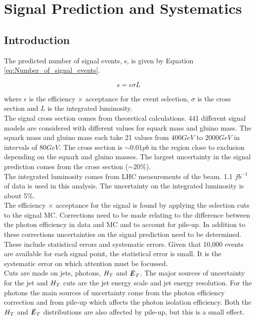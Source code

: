 \chapter{Signal Prediction and Systematics}

\section{Introduction}

The predicted number of signal events, s, is given by Equation
\ref{eq:Number_of_signal_events}.

\begin{equation}
s = \epsilon \sigma L
\label{eq:Number_of_signal_events}
\end{equation}

where $\epsilon$ is the efficiency $\times$ acceptance for the event selection,
$\sigma$ is the cross section and $L$ is the integrated luminosity. \\

The signal cross section comes from theoretical calculations. 441 different
signal models are considered with different values for squark mass and gluino 
mass. The squark mass and gluino mass each take 21 values from $400 \unit{GeV}$ 
to $2000 \unit{GeV}$ in intervals of $80 \unit{GeV}$. The cross section is $\sim 
0.01 \unit{pb}$ in the region close to exclusion depending on the squark and 
gluino masses. The largest uncertainty in the signal prediction comes from the 
cross section ($\sim 20 \unit{\%}$). \\

The integrated luminosity comes from LHC measurements of the beam. 1.1
$\unit{fb^{-1}}$ of data is used in this analysis. The uncertainty on the 
integrated luminosity is about 5\unit{\%}. \\

The efficiency $\times$ acceptance for the signal is found by applying the 
selection cuts to the signal MC. Corrections need to be made relating to the 
difference between the photon efficiency in data and MC and to account for 
pile-up. In addition to these corrections uncertainties on the signal prediction
need to be determined. These include statistical errors and systematic errors. 
Given that 10,000 events are available for each signal point, the statistical 
error is small. It is the systematic error on which attention must be focussed. 
\\

Cuts are made on jets, photons, $H_{T}$ and $\slashed{E}_{T}$. The major sources of
uncertainty for the jet and $H_{T}$ cuts are the jet energy scale and jet energy 
resolution. For the photons the main sources of uncertainty come from the photon
efficiency correction and from pile-up which affects the photon isolation 
efficiency. Both the $H_{T}$ and $\slashed{E}_{T}$ distributions are also affected by 
pile-up, but this is a small effect. \\

